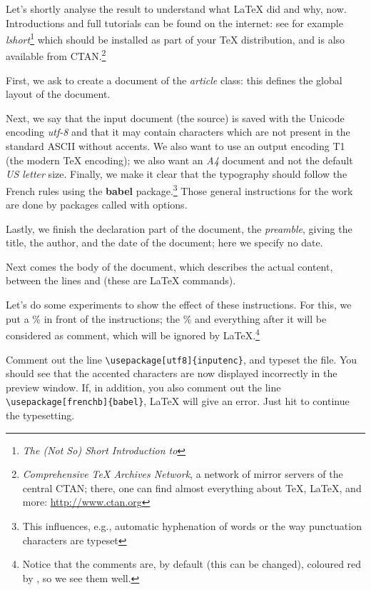 Let's shortly analyse the result to understand what \LaTeX{} did and why, now. Introductions and full tutorials can be found on the internet: see for example \emph{lshort}\footnote{\emph{The (Not So) Short Introduction to \LaTeXe}} which should be installed as part of your {\TeX} distribution, and is also available from CTAN.\footnote{\emph{Comprehensive TeX Archives Network}, a network of mirror servers of the central CTAN; there, one can find almost everything about {\TeX}, {\LaTeX}, and more: \url{http://www.ctan.org}}

First, we ask to create a document of the \emph{article} class: this defines the global layout of the document.

Next, we say that the input document (the source) is saved with the Unicode encoding \emph{utf-8} and that it may contain characters which are not present in the standard ASCII without accents. We also want to use an output encoding T1 (the modern {\TeX} encoding); we also want an \emph{A4} document and not the default \emph{US letter} size. Finally, we make it clear that the typography should follow the French rules using the \textbf{\textsf{babel}} package.\footnote{This influences, e.g., automatic hyphenation of words or the way punctuation characters are typeset} Those general instructions for the work are done by packages called with options.

Lastly, we finish the declaration part of the document, the \emph{preamble}, giving the title, the author, and the date of the document; here we specify no date.

Next comes the body of the document, which describes the actual content, between the lines \verb++ and \verb++ (these are {\LaTeX} commands).

Let's do some experiments to show the effect of these instructions. For this, we put a \% in front of the instructions; the \% and everything after it will be considered as comment, which will be ignored by {\LaTeX}.\footnote{Notice that the comments are, by default (this can be changed), coloured red by {\Tw}, so we see them well.}

Comment out the line \verb|\usepackage[utf8]{inputenc}|, and typeset the file. You should see that the accented characters are now displayed incorrectly in the preview window. If, in addition, you also comment out the line \verb|\usepackage[frenchb]{babel}|, {\LaTeX} will give an error. Just hit \Return to continue the typesetting.

